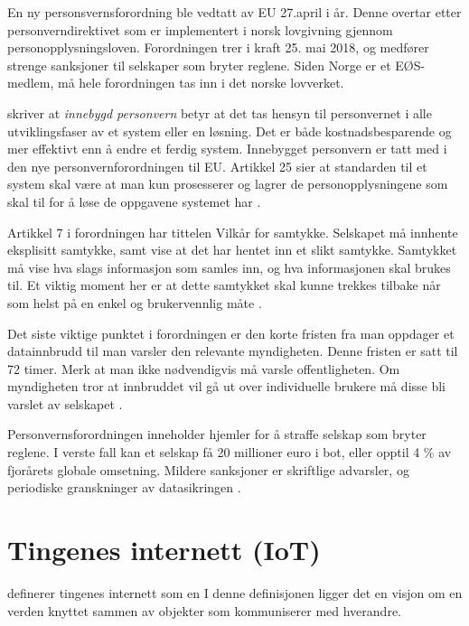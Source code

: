 En ny personsvernsforordning ble vedtatt av EU 27.april i år. Denne overtar
etter personverndirektivet som er implementert i norsk lovgivning gjennom
personopplysningsloven. Forordningen trer i kraft 25. mai 2018, og medfører
strenge sanksjoner til selskaper som bryter reglene. Siden Norge er et EØS-medlem,
må hele forordningen tas inn i det norske lovverket.

\citet{datatilsynet_privacy} skriver at \textit{innebygd personvern} betyr at det tas hensyn
til personvernet i alle utviklingsfaser av et system eller en løsning. Det er
både kostnadsbesparende og mer effektivt enn å endre et ferdig system. Innebygget
personvern er tatt med i den nye personvernforordningen til EU.
Artikkel 25 sier at standarden til et system skal være at man kun prosesserer
og lagrer de personopplysningene som skal til for å løse de oppgavene
systemet har \citep{eu-regulation}.

Artikkel 7 i forordningen har tittelen Vilkår for samtykke. Selskapet må
innhente eksplisitt samtykke, samt vise at det har hentet inn et slikt samtykke.
Samtykket må vise hva slags informasjon som samles inn, og hva informasjonen
skal brukes til. Et viktig moment her er at dette samtykket skal kunne
trekkes tilbake når som helst på en enkel og brukervennlig måte \citep{eu-regulation}.

Det siste viktige punktet i forordningen er den korte fristen fra man oppdager
et datainnbrudd til man varsler den relevante myndigheten. Denne fristen er
satt til 72 timer. Merk at man ikke nødvendigvis må varsle offentligheten. Om
myndigheten tror at innbruddet vil gå ut over individuelle brukere må disse
bli varslet av selskapet \citep{knowit}.

Personvernsforordningen inneholder hjemler for å straffe selskap som bryter reglene.
I verste fall kan et selskap få 20 millioner euro i
bot, eller opptil 4 \% av fjorårets globale omsetning.
Mildere sanksjoner er skriftlige advarsler, og periodiske
granskninger av datasikringen \citep{wiki:gdpr}.

\section{Tingenes internett (IoT)}
\citet{iot_legal} definerer tingenes internett som en
 I denne definisjonen ligger det en
visjon om en verden knyttet sammen av objekter som kommuniserer med hverandre.

